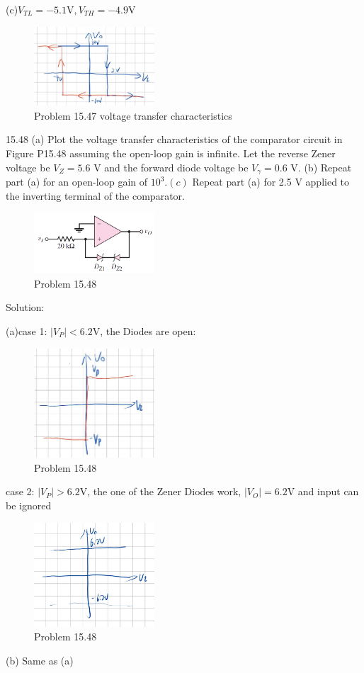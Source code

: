 \documentclass[a4paper,11pt,UTF8]{article}
\begin{document}
(c)$V_{TL}=-5.1\mathrm{V},V_{TH}=-4.9\mathrm{V}$
\begin{figure}[H]
	\centering
	\includegraphics[width=0.4\textwidth]{15.47_1}
	\caption{Problem 15.47 voltage transfer characteristics}
\end{figure}
15.48 (a) Plot the voltage transfer characteristics of the comparator circuit in Figure P15.48 assuming the open-loop gain is infinite. Let the reverse Zener voltage be $V_{Z}=5.6$ V and the forward diode voltage be $V_{\gamma}=0.6$ V. (b) Repeat part (a) for an open-loop gain of $10^3.(c)$ Repeat part (a) for 2.5 V
applied to the inverting terminal of the comparator.
\begin{figure}[H]
	\centering
	\includegraphics[width=0.4\textwidth]{15.48}
	\caption{Problem 15.48}
\end{figure}
\noindent Solution:

(a)case 1: $|V_P|<6.2$V, the Diodes are open:
\begin{figure}[H]
	\centering
	\includegraphics[width=0.4\textwidth]{15.48_1}
	\caption{Problem 15.48}
\end{figure}
case 2: $|V_P|>6.2$V, the one of the Zener Diodes work, $|V_O|=6.2$V and input can be ignored
\begin{figure}[H]
	\centering
	\includegraphics[width=0.4\textwidth]{15.48_2}
	\caption{Problem 15.48}
\end{figure}
(b) Same as (a)
\end{document}
